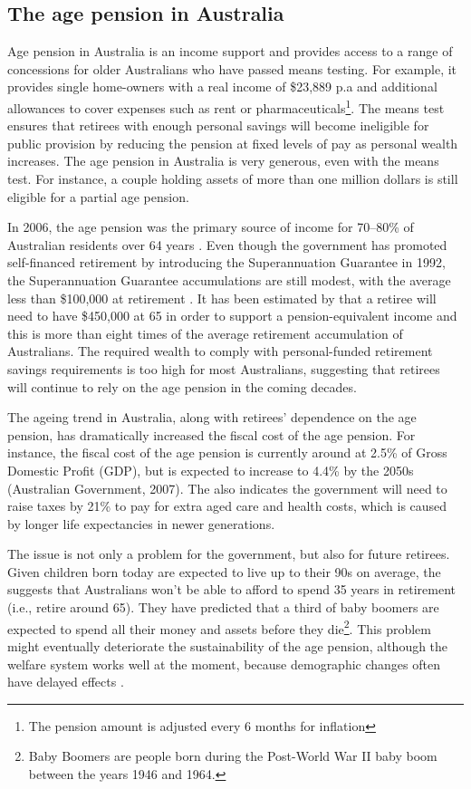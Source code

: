 \documentclass[11pt,a4paper,]{article}
\begin{document}
\hypertarget{the-age-pension-in-australia}{%
\subsection{The age pension in Australia}\label{the-age-pension-in-australia}}

Age pension in Australia is an income support and provides access to a range of concessions for older Australians who have passed means testing. For example, it provides single home-owners with a real income of \$23,889 p.a and additional allowances to cover expenses such as rent or pharmaceuticals\footnote{The pension amount is adjusted every 6 months for inflation}. The means test ensures that retirees with enough personal savings will become ineligible for public provision by reducing the pension at fixed levels of pay as personal wealth increases. The age pension in Australia is very generous, even with the means test. For instance, a couple holding assets of more than one million dollars is still eligible for a partial age pension.

In 2006, the age pension was the primary source of income for 70--80\% of Australian residents over 64 years \autocite{ABS06}. Even though the government has promoted self-financed retirement by introducing the Superannuation Guarantee in 1992, the Superannuation Guarantee accumulations are still modest, with the average less than \$100,000 at retirement \autocite{ASFA07}. It has been estimated by \textcite{PT08} that a retiree will need to have \$450,000 at 65 in order to support a pension-equivalent income and this is more than eight times of the average retirement accumulation of Australians. The required wealth to comply with personal-funded retirement savings requirements is too high for most Australians, suggesting that retirees will continue to rely on the age pension in the coming decades.

The ageing trend in Australia, along with retirees' dependence on the age pension, has dramatically increased the fiscal cost of the age pension. For instance, the fiscal cost of the age pension is currently around at 2.5\% of Gross Domestic Profit (GDP), but is expected to increase to 4.4\% by the 2050s (Australian Government, 2007). The \textcite{PC13} also indicates the government will need to raise taxes by 21\% to pay for extra aged care and health costs, which is caused by longer life expectancies in newer generations.

The issue is not only a problem for the government, but also for future retirees. Given children born today are expected to live up to their 90s on average, the \textcite{PC13} suggests that Australians won't be able to afford to spend 35 years in retirement (i.e., retire around 65). They have predicted that a third of baby boomers are expected to spend all their money and assets before they die\footnote{Baby Boomers are people born during the Post-World War II baby boom between the years 1946 and 1964.}. This problem might eventually deteriorate the sustainability of the age pension, although the welfare system works well at the moment, because demographic changes often have delayed effects \autocite{IGR02}.
\end{document}
